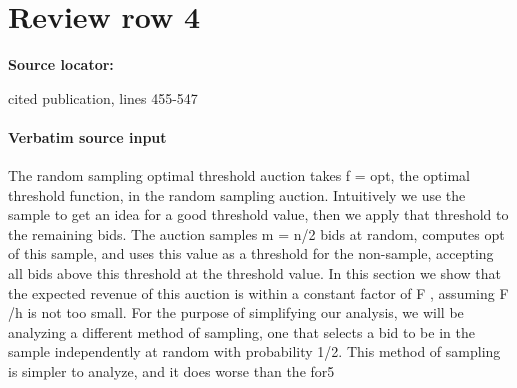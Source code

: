 \documentclass[10pt]{article}
\begin{document}
\section*{Review row 4}
\textbf{Source locator:} {\footnotesize\raggedright cited publication, lines 455-\allowbreak{}547\par}
\paragraph{Verbatim source input}
\begin{ReviewVerbatim}
The random sampling optimal threshold auction
takes f = opt, the optimal threshold function, in
the random sampling auction. Intuitively we use the
sample to get an idea for a good threshold value,
then we apply that threshold to the remaining bids.
The auction samples m = n/2 bids at random, computes opt of this sample, and uses this value as a
threshold for the non-sample, accepting all bids above
this threshold at the threshold value. In this section
we show that the expected revenue of this auction is
within a constant factor of F , assuming F /h is not
too small.
For the purpose of simplifying our analysis, we will
be analyzing a different method of sampling, one that
selects a bid to be in the sample independently at random with probability 1/2. This method of sampling
is simpler to analyze, and it does worse than the for5



\end{ReviewVerbatim}
\end{document}

